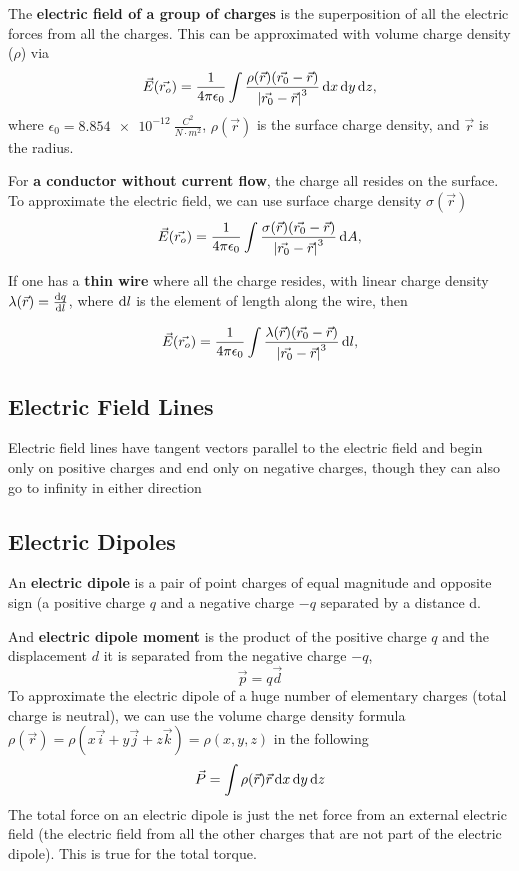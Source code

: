 The \textbf{electric field of a group of charges} is the superposition of all the electric forces from all the charges. This can be approximated with volume charge density ($\rho$) via
\begin{equation}
\vec{E}(\vec{r_o}) = \frac{1}{4\pi \epsilon_0} \int\frac{\rho(\vec{r}) (\vec{r_0} - \vec{r})}{\left| \vec{r_0} - \vec{r} \right|^3} \operatorname{d\!} x \operatorname{d\!} y \operatorname{d\!} z,
\end{equation}
where $\epsilon_0 = \SI{8.854e-12}{\frac{C^2}{N \cdot m^2}}$, $\rho(\vec{r})$ is the surface charge density, and $\vec{r}$ is the radius.

For \textbf{a conductor without current flow}, the charge all resides on the surface. To approximate the electric field, we can use surface charge density $\sigma (\vec{r})$
\begin{equation}
\vec{E}(\vec{r_o}) = \frac{1}{4\pi \epsilon_0} \int\frac{\sigma(\vec{r}) (\vec{r_0} - \vec{r})}{\left| \vec{r_0} - \vec{r} \right|^3} \operatorname{d\!} A,
\end{equation}

If one has a \textbf{thin wire} where all the charge resides, with linear charge density $\lambda(\vec{r}) = \frac{\operatorname{d\!} q}{\operatorname{d\!} l}$, where $\operatorname{d\!} l$ is the element of length along the wire, then

\begin{equation}
\vec{E}(\vec{r_o}) = \frac{1}{4\pi \epsilon_0} \int\frac{\lambda(\vec{r}) (\vec{r_0} - \vec{r})}{\left| \vec{r_0} - \vec{r} \right|^3} \operatorname{d\!} l,
\end{equation}

\subsection{Electric Field Lines}
Electric field lines have tangent vectors parallel to the electric field and begin only on positive charges and end only on negative charges, though they can also go to infinity in either direction

\newpage
\subsection{Electric Dipoles}
An \textbf{electric dipole} is a pair of point charges of equal magnitude and opposite sign (a positive charge $q$ and a negative charge $-q$ separated by a distance d.

And \textbf{electric dipole moment} is the product of the positive charge $q$ and the displacement $d$ it is separated from the negative charge $-q$,
\begin{equation}
\vec{p} = q\vec{d}
\end{equation}
To approximate the electric dipole of a huge number of elementary charges (total charge is neutral), we can use the volume charge density formula $\rho(\vec{r}) = \rho(x\vec{i} + y\vec{j} + z\vec{k}) = \rho(x, y, z) $ in the following
\begin{equation}
\vec{P} = \int\rho(\vec{r})\vec{r}\operatorname{d\!} x \operatorname{d\!} y \operatorname{d\!} z
\end{equation}
The total force on an electric dipole is just the net force from an external electric field (the electric field from all the other charges that are not part of the electric dipole). This is true for the total torque.

